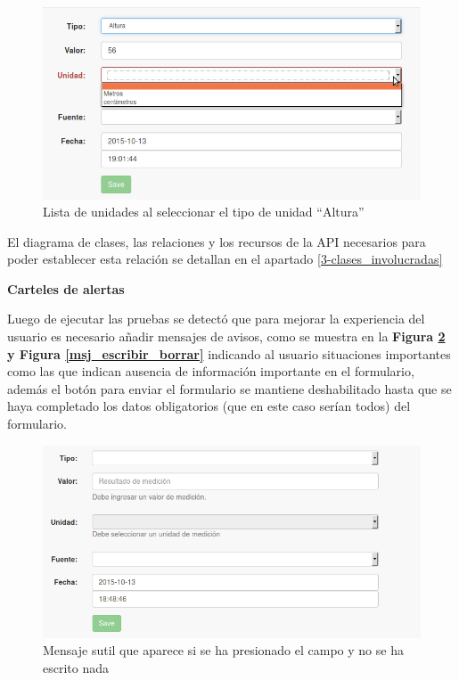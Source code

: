 \documentclass[a4paper,12pt]{article}
\begin{document}
 \begin{figure}[h!]
  \centering
  \includegraphics[width=.8\textwidth]{img/3-unidad_altura}
  \caption{Lista de unidades al seleccionar el tipo de unidad ``Altura''}
  \label{unidad_altura}
\end{figure}


El diagrama de clases, las relaciones y los recursos de la API necesarios para poder establecer esta relación se detallan en el apartado \ref{3-clases_involucradas}

\textbf{Carteles de alertas}

Luego de ejecutar las pruebas se detectó que para mejorar la experiencia del usuario es necesario añadir mensajes de avisos, como se muestra en la \textbf{Figura \ref{msj_presiona_no_escribe} y Figura \ref{msj_escribir_borrar}} indicando al usuario situaciones importantes como las que indican ausencia de información importante en el formulario, además el botón para enviar el formulario se mantiene deshabilitado hasta que se haya completado los datos obligatorios (que en este caso serían todos) del formulario.


 \begin{figure}[h!]
  \centering
  \includegraphics[width=.8\textwidth]{img/3-presiona_no_escribe}
  \caption{Mensaje sutil que aparece  si se ha presionado el campo y no se ha escrito nada}
  \label{msj_presiona_no_escribe}
\end{figure}
\end{document}
